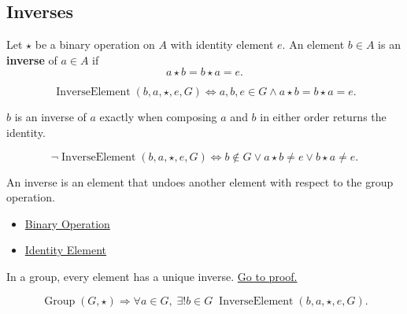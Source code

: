 \subsection*{Inverses}
\label{subsec:inverses}

\begin{definition}
\label{def:inverse-element}
Let $\star$ be a binary operation on $A$ with identity element $e$.
An element $b\in A$ is an \textbf{inverse} of $a\in A$ if
\[
a\star b=b\star a=e.
\]
\end{definition}

\begin{remark*}
\[
\operatorname{InverseElement}(b,a,\star,e,G)
\Longleftrightarrow
a,b,e\in G
\land
a\star b=b\star a=e.
\]
\end{remark*}

\begin{remark*}
$b$ is an inverse of $a$ exactly when composing $a$ and $b$ in either order
returns the identity.
\end{remark*}

\begin{remark*}
\[
\neg\operatorname{InverseElement}(b,a,\star,e,G)
\Longleftrightarrow
b\notin G
\lor
a\star b\neq e
\lor
b\star a\neq e.
\]
\end{remark*}

\begin{remark*}[Interpretation]
An inverse is an element that undoes another element with respect to the group
operation.
\end{remark*}

\begin{dependencies}
\begin{itemize}
  \item \hyperref[def:binary-operation]{Binary Operation}
  \item \hyperref[def:identity-element]{Identity Element}
\end{itemize}
\end{dependencies}

\begin{proposition}
\label{prop:inverse-element-unique}
In a group, every element has a unique inverse.
\hyperref[prf:group-inverse-unique]{Go to proof.}
\end{proposition}

\begin{remark*}
\[
\operatorname{Group}(G,\star)
\Longrightarrow
\forall a\in G,\; \exists! b\in G\;
\operatorname{InverseElement}(b,a,\star,e,G).
\]
\end{remark*}

